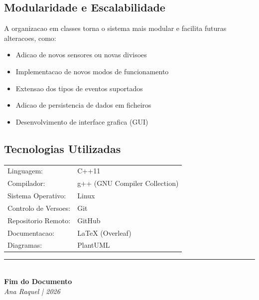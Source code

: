 \documentclass[12pt,a4paper]{article}
\begin{document}
\subsection{Modularidade e Escalabilidade}

A organizacao em classes torna o sistema mais modular e facilita futuras alteracoes, como:
\begin{itemize}
    \item Adicao de novos sensores ou novas divisoes
    \item Implementacao de novos modos de funcionamento
    \item Extensao dos tipos de eventos suportados
    \item Adicao de persistencia de dados em ficheiros
    \item Desenvolvimento de interface grafica (GUI)
\end{itemize}

\subsection{Tecnologias Utilizadas}

\begin{center}
\begin{tabular}{l l}
Linguagem: & C++11 \\
Compilador: & g++ (GNU Compiler Collection) \\
Sistema Operativo: & Linux \\
Controlo de Versoes: & Git \\
Repositorio Remoto: & GitHub \\
Documentacao: & LaTeX (Overleaf) \\
Diagramas: & PlantUML \\
\end{tabular}
\end{center}

\vfill

\begin{center}
\rule{8cm}{0.5pt}\\[0.5cm]
{\Large\textbf{Fim do Documento}}\\[0.3cm]
\textit{Ana Raquel | 2026}
\end{center}
\end{document}
